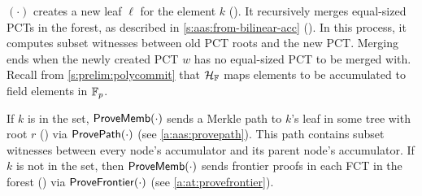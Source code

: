 {\append}$(\cdot)$ creates a new leaf $\ell$ for the element $k$ ().
It recursively merges equal-sized PCTs in the forest, as described in \cref{s:aas:from-bilinear-acc} ().
In this process, it computes subset witnesses between old PCT roots and the new PCT.
Merging ends when the newly created PCT $w$ has no equal-sized PCT to be merged with.
Recall from \cref{s:prelim:polycommit} that $\mathcal{H}_{\mathbb{F}}$ maps elements to be accumulated to field elements in $\mathbb{F}_p$.

If $k$ is in the set, $\mathsf{ProveMemb}(\cdot)$ sends a Merkle path to $k$'s leaf in some tree with root $r$ () via $\mathsf{ProvePath}(\cdot)$ (see \cref{a:aas:provepath}).
This path contains subset witnesses between every node's accumulator and its parent node's accumulator.
If $k$ is not in the set, then $\mathsf{ProveMemb}(\cdot)$ sends frontier proofs in each FCT in the forest () via $\mathsf{ProveFrontier}(\cdot)$ (see \cref{a:at:provefrontier}).

